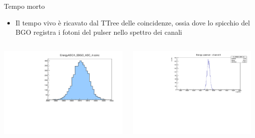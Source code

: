 \documentclass [xcolor=svgnames] {beamer}
\begin{document}
\begin{frame}{Tempo morto}%
	\begin{itemize}
		\item Il tempo vivo è ricavato dal TTree delle coincidenze, ossia dove lo spicchio del BGO registra i fotoni del pulser nello spettro dei canali
	\end{itemize}
	\begin{columns}
		\begin{column}{0.5\textwidth}
			\includegraphics[width=\textwidth]{img/run1776_coinc_h_EBGO_ADC_4_COINC.pdf}
		\end{column}
		\begin{column}{0.5\textwidth}
			\includegraphics[width=\textwidth]{img/pulser.pdf}
		\end{column}
	\end{columns}
\end{frame}
\end{document}
